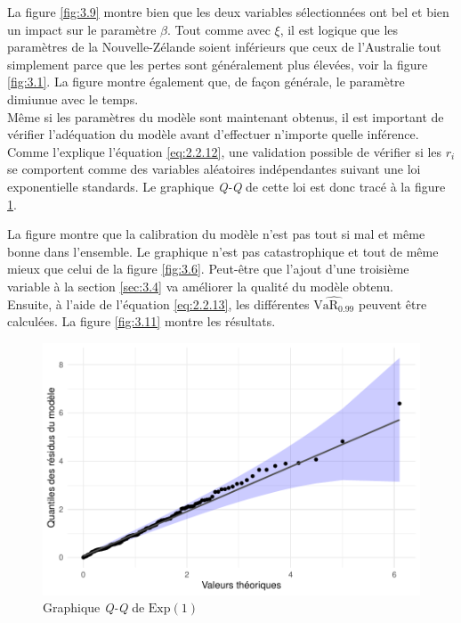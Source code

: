 La figure \ref{fig:3.9} montre bien que les deux variables sélectionnées ont bel et bien un impact sur le paramètre $\beta$. Tout comme avec $\xi$, il est logique que les paramètres de la Nouvelle-Zélande soient inférieurs que ceux de l'Australie tout simplement parce que les pertes sont généralement plus élevées, voir la figure \ref{fig:3.1}. La figure montre également que, de façon générale, le paramètre dimiunue avec le temps.
\\

Même si les paramètres du modèle sont maintenant obtenus, il est important de vérifier l'adéquation du modèle avant d'effectuer n'importe quelle inférence. Comme l'explique l'équation \ref{eq:2.2.12}, une validation possible de vérifier si les $r_i$ se comportent comme des variables aléatoires indépendantes suivant une loi exponentielle standards. Le graphique \textit{Q-Q} de cette loi est donc tracé à la figure \ref{fig:3.10}.

La figure montre que la calibration du modèle n'est pas tout si mal et même bonne dans l'ensemble. Le graphique n'est pas catastrophique et tout de même mieux que celui de la figure \ref{fig:3.6}. Peut-être que l'ajout d'une troisième variable à la section \ref{sec:3.4} va améliorer la qualité du modèle obtenu.
\\

Ensuite, à l'aide de l'équation \ref{eq:2.2.13}, les différentes $\widehat{\text{VaR}_{0.99}}$ peuvent être calculées. La figure \ref{fig:3.11} montre les résultats. 
\begin{figure}[h]
\begin{center}
\includegraphics{images/fig-018}
\end{center}
\caption{Graphique \textit{Q-Q} de $\text{Exp}(1)$}
\label{fig:3.10}
\end{figure}

